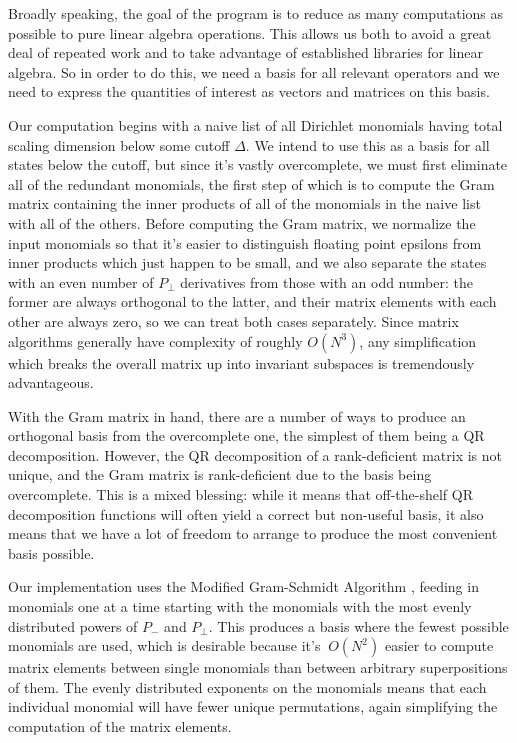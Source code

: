 \begin{subappendices}
Broadly speaking, the goal of the program is to reduce as many computations as
possible to pure linear algebra operations. This allows us both to avoid a great
deal of repeated work and to take advantage of established libraries for linear
algebra. So in order to do this, we need a basis for all relevant operators and
we need to express the quantities of interest as vectors and matrices on this
basis.

Our computation begins with a naive list of all Dirichlet monomials having total 
scaling dimension below some cutoff $\Delta$. We intend to use this as a basis
for all states below the cutoff, but since it's vastly overcomplete, we must 
first eliminate all of the redundant monomials, the first step of which is to 
compute the Gram matrix containing the inner products of all of the monomials in 
the naive list with all of the others. Before computing the Gram matrix, we 
normalize the input monomials so that it's easier to distinguish floating point 
epsilons from inner products which just happen to be small, and we also separate
the states with an even number of $P_\perp$ derivatives from those with an odd
number: the former are always orthogonal to the latter, and their matrix 
elements with each other are always zero, so we can treat both cases separately.
Since matrix algorithms generally have complexity of roughly $O(N^3)$, any
simplification which breaks the overall matrix up into invariant subspaces is 
tremendously advantageous.

With the Gram matrix in hand, there are a number of ways to produce an 
orthogonal basis from the overcomplete one, the simplest of them being a QR
decomposition. However, the QR decomposition of a rank-deficient matrix is not
unique, and the Gram matrix is rank-deficient due to the basis being 
overcomplete. This is a mixed blessing: while it means that off-the-shelf QR
decomposition functions will often yield a correct but non-useful basis, it also
means that we have a lot of freedom to arrange to produce the most convenient
basis possible.

Our implementation uses the Modified Gram-Schmidt Algorithm 
\cite{Code:ModGramSchmidt}, feeding in monomials one at a time starting with the
monomials with the most evenly distributed powers of $P_-$ and $P_\perp$. This
produces a basis where the fewest possible monomials are used, which is 
desirable because it's $~O(N^2)$ easier to compute matrix elements between 
single monomials than between arbitrary superpositions of them. The evenly 
distributed exponents on the monomials means that each individual monomial will
have fewer unique permutations, again simplifying the computation of the matrix
elements.


\end{subappendices}
